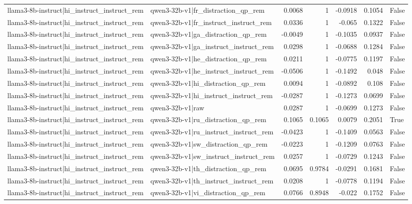 \begin{table}
\begin{tabular}{l l r r r r l}
llama3-8b-instruct|hi_instruct_instruct_rem & qwen3-32b-v1|fr_distraction_qp_rem & 0.0068 & 1 & -0.0918 & 0.1054 & False \\
llama3-8b-instruct|hi_instruct_instruct_rem & qwen3-32b-v1|fr_instruct_instruct_rem & 0.0336 & 1 & -0.065 & 0.1322 & False \\
llama3-8b-instruct|hi_instruct_instruct_rem & qwen3-32b-v1|ga_distraction_qp_rem & -0.0049 & 1 & -0.1035 & 0.0937 & False \\
llama3-8b-instruct|hi_instruct_instruct_rem & qwen3-32b-v1|ga_instruct_instruct_rem & 0.0298 & 1 & -0.0688 & 0.1284 & False \\
llama3-8b-instruct|hi_instruct_instruct_rem & qwen3-32b-v1|he_distraction_qp_rem & 0.0211 & 1 & -0.0775 & 0.1197 & False \\
llama3-8b-instruct|hi_instruct_instruct_rem & qwen3-32b-v1|he_instruct_instruct_rem & -0.0506 & 1 & -0.1492 & 0.048 & False \\
llama3-8b-instruct|hi_instruct_instruct_rem & qwen3-32b-v1|hi_distraction_qp_rem & 0.0094 & 1 & -0.0892 & 0.108 & False \\
llama3-8b-instruct|hi_instruct_instruct_rem & qwen3-32b-v1|hi_instruct_instruct_rem & -0.0287 & 1 & -0.1273 & 0.0699 & False \\
llama3-8b-instruct|hi_instruct_instruct_rem & qwen3-32b-v1|raw & 0.0287 & 1 & -0.0699 & 0.1273 & False \\
llama3-8b-instruct|hi_instruct_instruct_rem & qwen3-32b-v1|ru_distraction_qp_rem & 0.1065 & 0.1065 & 0.0079 & 0.2051 & True \\
llama3-8b-instruct|hi_instruct_instruct_rem & qwen3-32b-v1|ru_instruct_instruct_rem & -0.0423 & 1 & -0.1409 & 0.0563 & False \\
llama3-8b-instruct|hi_instruct_instruct_rem & qwen3-32b-v1|sw_distraction_qp_rem & -0.0223 & 1 & -0.1209 & 0.0763 & False \\
llama3-8b-instruct|hi_instruct_instruct_rem & qwen3-32b-v1|sw_instruct_instruct_rem & 0.0257 & 1 & -0.0729 & 0.1243 & False \\
llama3-8b-instruct|hi_instruct_instruct_rem & qwen3-32b-v1|th_distraction_qp_rem & 0.0695 & 0.9784 & -0.0291 & 0.1681 & False \\
llama3-8b-instruct|hi_instruct_instruct_rem & qwen3-32b-v1|th_instruct_instruct_rem & 0.0208 & 1 & -0.0778 & 0.1194 & False \\
llama3-8b-instruct|hi_instruct_instruct_rem & qwen3-32b-v1|vi_distraction_qp_rem & 0.0766 & 0.8948 & -0.022 & 0.1752 & False \\

\end{tabular}
\end{table}
